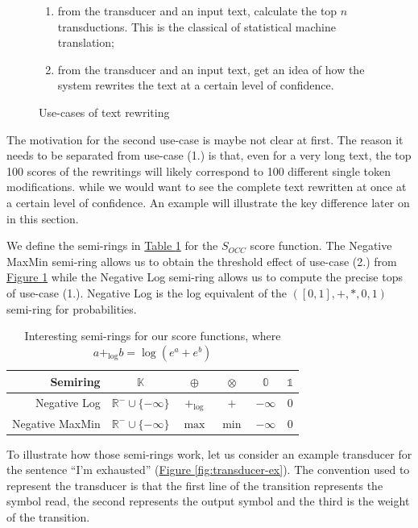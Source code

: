 \documentclass[a4paper, 11pt, onepage]{scrreprt}
\newcommand\tableref[1]{\hyperref[#1]{Table \ref*{#1}}}
\newcommand\figureref[1]{\hyperref[#1]{Figure \ref*{#1}}}
\begin{document}
\begin{figure}[H]
  \centering
  \begin{enumerate}
  \item from the transducer and an input text, calculate the top $n$
    transductions. This is the classical of statistical machine
    translation;
  \item from the transducer and an input text, get an idea of how the
    system rewrites the text at a certain level of confidence.
  \end{enumerate}
  
  \caption{Use-cases of text rewriting}
\label{fig:use-cases}
\end{figure}

The motivation for the second use-case is maybe not clear at
first. The reason it needs to be separated from use-case (1.) is that,
even for a very long text, the top 100 scores of the rewritings will
likely correspond to 100 different single token modifications.  while
we would want to see the complete text rewritten at once at a certain
level of confidence. An example will illustrate the key difference
later on in this section.

We define the semi-rings in \tableref{tab:semi-rings} for the
$S_{OCC}$ score function. The Negative MaxMin semi-ring allows us to
obtain the threshold effect of use-case (2.) from
\figureref{fig:use-cases} while the Negative Log semi-ring allows us
to compute the precise tops of use-case (1.). Negative Log is the log
equivalent of the $(\left[0, 1\right], +, *, 0, 1)$ semi-ring for
probabilities.

\begin{table}[H]
  \centering
  \caption{Interesting semi-rings for our score functions, where
    $a +_{\log} b = \log\left(e^a + e^b\right)$}
  \begin{tabular}{rccccc}
    \toprule
    Semiring & $\mathbb{K}$ & $\oplus$ & $\otimes$ & $\mathbb{0}$ & $\mathbb{1}$
    \\
    \midrule
    Negative Log & $\mathbb{R}^{-} \cup \{-\infty\}$ & $+_{\log}$ & $+$ & $-\infty$ & $0$ \\
    Negative MaxMin & $\mathbb{R}^{-} \cup \{-\infty\}$ & $\max$ & $\min$ & $-\infty$ & $0$ \\
  \end{tabular}
  \label{tab:semi-rings}
\end{table}

To illustrate how those semi-rings work, let us consider an example
transducer for the sentence “I'm exhausted”
(\figureref{fig:transducer-ex}). The convention used to represent the
transducer is that the first line of the transition represents the
symbol read, the second represents the output symbol and the third is
the weight of the transition.
\end{document}
